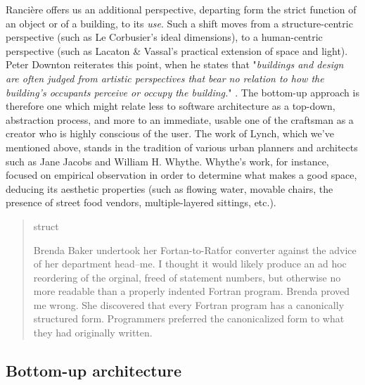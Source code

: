 Rancière offers us an additional perspective, departing form the strict function of an object or of a building, to its \emph{use}. Such a shift moves from a structure-centric perspective (such as Le Corbusier's ideal dimensions), to a human-centric perspective (such as Lacaton \& Vassal's practical extension of space and light). Peter Downton reiterates this point, when he states that "\emph{buildings and design are often judged from artistic perspectives that bear no relation to how the building’s occupants perceive or occupy the building.}" \citep{downton_knowledge_1998}. The bottom-up approach is therefore one which might relate less to software architecture as a top-down, abstraction process, and more to an immediate, usable one of the craftsman as a creator who is highly conscious of the user. The work of Lynch, which we've mentioned above, stands in the tradition of various urban planners and architects such as Jane Jacobs and William H. Whythe. Whythe's work, for instance, focused on empirical observation in order to determine what makes a good space, deducing its aesthetic properties (such as flowing water, movable chairs, the presence of street food vendors, multiple-layered sittings, etc.).




\begin{quote}
    struct

    Brenda Baker undertook her Fortan-to-Ratfor converter against the advice of her department head--me. I thought it would likely produce an ad hoc reordering of the orginal, freed of statement numbers, but otherwise no more readable than a properly indented Fortran program. Brenda proved me wrong. She discovered that every Fortran program has a canonically structured form. Programmers preferred the canonicalized form to what
they had originally written. 
\end{quote}

\subsection{Bottom-up architecture}
\label{subsubsec:bottom-up-architecture}


